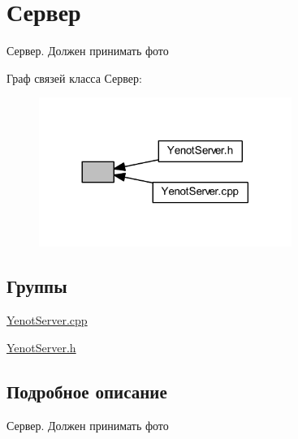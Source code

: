 \hypertarget{group__server}{}\section{Сервер}
\label{group__server}


Сервер. Должен принимать фото  


Граф связей класса Сервер\+:\nopagebreak
\begin{figure}[H]
\begin{center}
\leavevmode
\includegraphics[width=233pt]{group__server}
\end{center}
\end{figure}
\subsection*{Группы}
\begin{DoxyCompactItemize}
\item 
\mbox{\hyperlink{group__serveryenotservercpp}{Yenot\+Server.\+cpp}}
\item 
\mbox{\hyperlink{group__serveryenotserverh}{Yenot\+Server.\+h}}
\end{DoxyCompactItemize}


\subsection{Подробное описание}
Сервер. Должен принимать фото 

